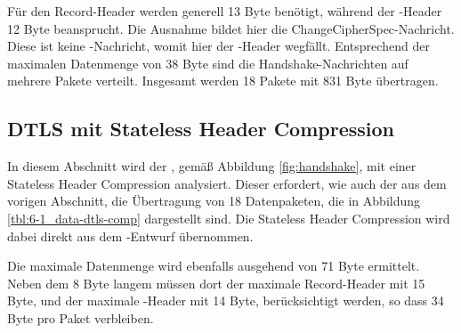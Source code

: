 Für den Record-Header werden generell 13 Byte benötigt, während der -Header 12 Byte beansprucht. Die Ausnahme bildet hier die ChangeCipherSpec-Nachricht.
Diese ist keine -Nachricht, womit hier der -Header wegfällt. Entsprechend der maximalen Datenmenge von 38 Byte sind die Handshake-Nachrichten
auf mehrere Pakete verteilt. Insgesamt werden 18 Pakete mit 831 Byte übertragen.

\subsection{DTLS mit Stateless Header Compression}

In diesem Abschnitt wird der , gemäß Abbildung \ref{fig:handshake}, mit einer Stateless Header Compression analysiert. Dieser erfordert,
wie auch der  aus dem vorigen Abschnitt, die Übertragung von 18 Datenpaketen, die in Abbildung \ref{tbl:6-1_data-dtls-comp} dargestellt sind.
Die Stateless Header Compression wird dabei direkt aus dem -Entwurf \cite[Kapitel 3]{draftcodtls} übernommen.

Die maximale Datenmenge wird ebenfalls ausgehend von 71 Byte ermittelt. Neben dem 8 Byte langem  müssen dort der maximale Record-Header mit 15 Byte, und
der maximale -Header mit 14 Byte, berücksichtigt werden, so dass 34 Byte pro Paket verbleiben.

